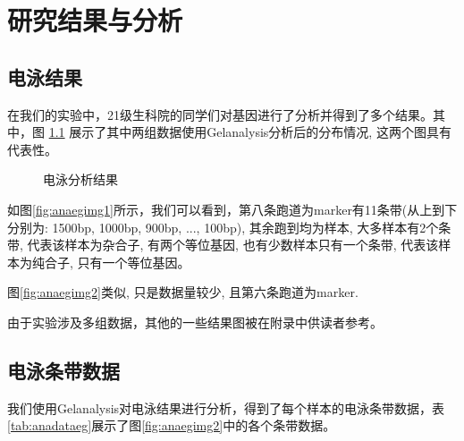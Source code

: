 \documentclass[AutoFakeBold]{LZUThesis}
\begin{document}
\begin{enumerate}
\end{enumerate}


\chapter{研究结果与分析}

\section{电泳结果}
在我们的实验中，21级生科院的同学们对基因进行了分析并得到了多个结果。其中，图 \ref{fig:anamainegimg} 展示了其中两组数据使用Gelanalysis分析后的分布情况, 这两个图具有代表性。

\begin{figure}[H]
    \centering

    \hfill
    \caption{电泳分析结果}
    \label{fig:anamainegimg}
\end{figure}

如图\ref{fig:anaegimg1}所示，我们可以看到，第八条跑道为marker有11条带(从上到下分别为: 1500bp, 1000bp, 900bp, ..., 100bp),
其余跑到均为样本, 大多样本有2个条带, 代表该样本为杂合子, 有两个等位基因, 也有少数样本只有一个条带, 代表该样本为纯合子, 只有一个等位基因。

图\ref{fig:anaegimg2}类似, 只是数据量较少, 且第六条跑道为marker.

由于实验涉及多组数据，其他的一些结果图被在附录中供读者参考。
\section{电泳条带数据}
我们使用Gelanalysis对电泳结果进行分析，得到了每个样本的电泳条带数据，表\ref{tab:anadataeg}展示了图\ref{fig:anaegimg2}中的各个条带数据。
\end{document}
